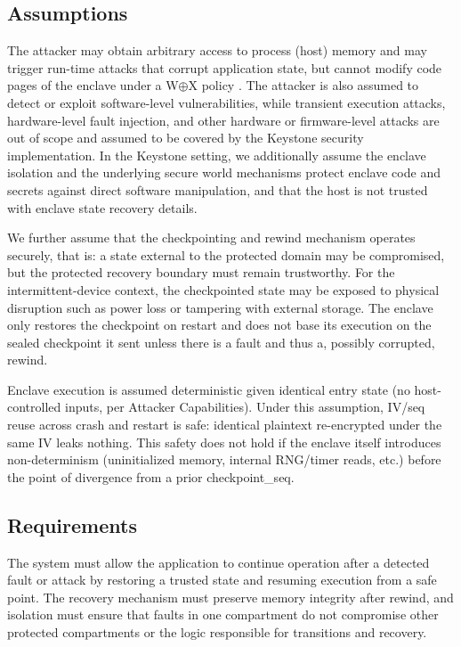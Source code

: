 \documentclass[11pt,a4paper]{report}
\begin{document}
\subsection{Assumptions}
The attacker may obtain arbitrary access to process (host) memory and may trigger run-time attacks that corrupt application state, but cannot modify code pages of the enclave under a W\(\oplus\)X policy \cite{sdrad, security-privacy}. 
The attacker is also assumed to detect or exploit software-level vulnerabilities, while transient execution attacks, hardware-level fault injection, and other hardware or firmware-level attacks are out of scope and assumed to be covered by the Keystone security implementation. 
In the Keystone setting, we additionally assume the enclave isolation and the underlying secure world mechanisms protect enclave code and secrets against direct software manipulation, and that the host is not trusted with enclave state recovery details.

We further assume that the checkpointing and rewind mechanism operates securely, that is: a state external to the protected domain may be compromised, but the protected recovery boundary must remain trustworthy. 
For the intermittent-device context, the checkpointed state may be exposed to physical disruption such as power loss or tampering with external storage.
The enclave only restores the checkpoint on restart and does not base its execution on the sealed checkpoint it sent unless there is a fault and thus a, possibly corrupted, rewind.

Enclave execution is assumed deterministic given identical entry state (no host-controlled inputs, per Attacker Capabilities). Under this assumption, IV/seq reuse across crash and restart is safe: identical plaintext re-encrypted under the same IV leaks nothing.
This safety does not hold if the enclave itself introduces non-determinism (uninitialized memory, internal RNG/timer reads, etc.) before the point of divergence from a prior checkpoint\_seq.

\subsection{Requirements}
The system must allow the application to continue operation after a detected fault or attack by restoring a trusted state and resuming execution from a safe point. 
The recovery mechanism must preserve memory integrity after rewind, and isolation must ensure that faults in one compartment do not compromise other protected compartments or the logic responsible for transitions and recovery.
\end{document}
